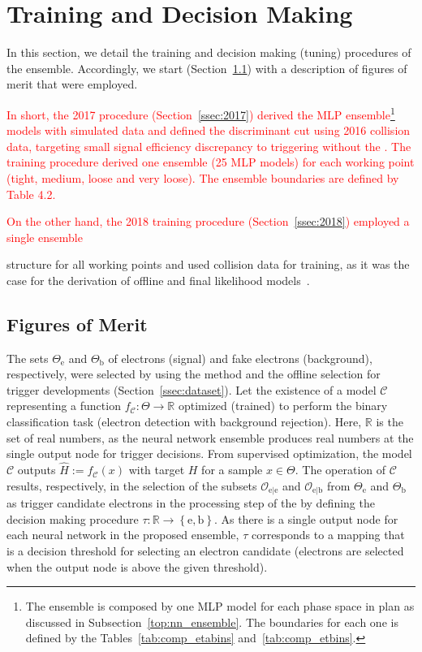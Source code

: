 \section{Training and Decision Making}%
\label{sec:tuning}

In this section, we detail the training and decision making (tuning) procedures
of the \rnn ensemble. Accordingly, we start (Section~\ref{ssec:fom}) with a
description of figures of merit that were employed.

\textcolor{red}{In short, the 2017 procedure (Section~\ref{ssec:2017}) derived the MLP ensemble\footnote{
  The ensemble is composed by one MLP model for each phase space in plan \eteta as discussed 
  in Subsection~\ref{top:nn_ensemble}. The boundaries for each one is defined by the 
  Tables~\ref{tab:comp_etabins} and~\ref{tab:comp_etbins}.} 
models with simulated data and defined the discriminant cut using
2016 collision data, targeting small signal efficiency discrepancy to triggering 
without the \rnn. The training procedure derived one ensemble (25 MLP models) for each working point (tight, medium, loose and very loose). 
The ensemble boundaries are defined by Table 4.2. 

On the other hand, the 2018 training procedure (Section~\ref{ssec:2018})
employed a single ensemble }structure for all working points and used
collision data for training, as it was the case for the derivation of offline
and final \hlt likelihood models~\cite{aaboud2019electron}.

\subsection{Figures of Merit}\label{ssec:fom}



The sets $\Theta_{\text{e}}$ and $\Theta_{\text{b}}$ of electrons (signal) and fake electrons (background), respectively, were selected by using the \tnp{} method and the offline selection for trigger developments (Section~\ref{ssec:dataset}). Let the existence of a model $\mathcal{C}$ representing a function $f_{\mathcal{C}} : \Theta \rightarrow \mathbb{R}$ optimized (trained) to perform the binary classification task (electron detection with background rejection). Here, $\mathbb{R}$ is the set of real numbers, as the neural network ensemble produces real numbers at the single output node for trigger decisions.  From supervised optimization, the model $\mathcal{C}$ outputs $\hat{H}:=f_{\mathcal{C}}(x)$ with target $H$ for a sample $x \in \Theta$. The operation of $\mathcal{C}$ results, respectively, in the selection of the subsets $\mathcal{O}_{\text{e}|\text{e}}$ and $\mathcal{O}_{\text{e}|\text{b}}$ from $\Theta_{\text{e}}$ and $\Theta_{\text{b}}$ as trigger candidate electrons in the \fastcalo{} processing step of the \hlt{} by defining the decision making procedure $\tau : \mathbb{R} \rightarrow \left\{\text{e},\text{b}\right\}$. As there is a single output node for each neural network in the proposed \rnn{} ensemble, $\tau$ corresponds to a mapping that is a decision threshold for selecting an electron candidate (electrons are selected when the output node is above the given threshold).  


